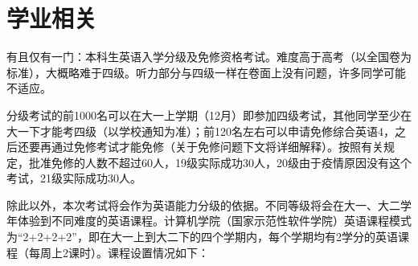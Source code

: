 \section{学业相关}


有且仅有一门：本科生英语入学分级及免修资格考试。难度高于高考（以全国卷为标准），大概略难于四级。听力部分与四级一样在卷面上没有问题，许多同学可能不适应。

分级考试的前1000名可以在大一上学期（12月）即参加四级考试，其他同学至少在大一下才能考四级（以学校通知为准）；前120名左右可以申请免修综合英语4，之后还要再通过免修考试才能免修（关于免修问题下文将详细解释）。按照有关规定，批准免修的人数不超过60人，19级实际成功30人，20级由于疫情原因没有这个考试，21级实际成功30人。

除此以外，本次考试将会作为英语能力分级的依据。不同等级将会在大一、大二学年体验到不同难度的英语课程。计算机学院（国家示范性软件学院）英语课程模式为“2+2+2+2”，即在大一上到大二下的四个学期内，每个学期均有2学分的英语课程（每周上2课时）。课程设置情况如下：


